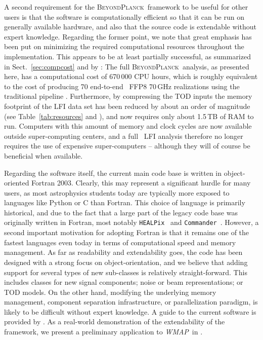 \documentclass[onecolumn]{aa}
\def\WMAP{\emph{WMAP}}
\def\commander{\texttt{Commander}}
\newcommand{\BP}{\textsc{BeyondPlanck}}
\newcommand{\HEALPix}[0]{\texttt{HEALPix}}
\begin{document}
A second requirement for the \BP\ framework to be useful for other
users is that the software is computationally efficient so that it can
be run on generally available hardware, and also that the source code
is extendable without expert knowledge. Regarding the former point, we
note that great emphasis has been put on minimizing the required
computational resources throughout the implementation. This appears to
be at least partially successful, as summarized in
Sect.~\ref{sec:compcost} and by \citet{bp03}: The full \BP\ analysis,
as presented here, has a computational cost of 670\,000 CPU hours,
which is roughly equivalent to the cost of producing 70 end-to-end
\Planck\ FFP8 70\,GHz realizations using the traditional pipeline
\citep{planck2014-a14}. Furthermore, by compressing the TOD inputs the
memory footprint of the LFI data set has been reduced by about an
order of magnitude (see Table~\ref{tab:resources} and \citealp{bp03}),
and now requires only about 1.5\,TB of RAM to run. Computers with this
amount of memory and clock cycles are now available outside
super-computing centers, and a full \Planck\ LFI analysis therefore no
longer requires the use of expensive super-computers -- although they
will of course be beneficial when available.

Regarding the software itself, the current main code base is written
in object-oriented Fortran 2003. Clearly, this may represent a
significant hurdle for many users, as most astrophysics students today
are typically more exposed to languages like Python or C than
Fortran. This choice of language is primarily historical, and due to
the fact that a large part of the legacy code base was originally
written in Fortran, most notably \HEALPix\ \citep{gorski2005} and
\commander\ \citep{eriksen:2004,eriksen2008}. However, a second
important motivation for adopting Fortran is that it remains one of
the fastest languages even today in terms of computational speed
and memory management. As far as readability and extendability goes,
the code has been designed with a strong focus on object-orientation,
and we believe that adding support for several types of new
sub-classes is relatively straight-forward. This includes classes for
new signal components; noise or beam representations; or TOD
models. On the other hand, modifying the underlying memory management,
component separation infrastructure, or parallelization paradigm, is
likely to be difficult without expert knowledge. A guide to the
current software is provided by \citet{bp03}. As a real-world
demonstration of the extendability of the framework, we present
a preliminary application to \WMAP\ in \citep{bp17}.
\end{document}
